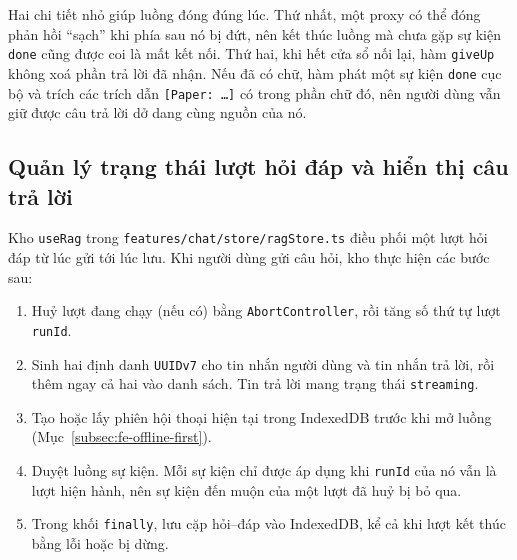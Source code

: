 
Hai chi tiết nhỏ giúp luồng đóng đúng lúc. Thứ nhất, một proxy có thể đóng phản hồi ``sạch'' khi phía sau nó bị đứt, nên kết thúc luồng mà chưa gặp sự kiện \texttt{done} cũng được coi là mất kết nối. Thứ hai, khi hết cửa sổ nối lại, hàm \texttt{giveUp} không xoá phần trả lời đã nhận. Nếu đã có chữ, hàm phát một sự kiện \texttt{done} cục bộ và trích các trích dẫn \texttt{[Paper: \dots]} có trong phần chữ đó, nên người dùng vẫn giữ được câu trả lời dở dang cùng nguồn của nó.

\subsection{Quản lý trạng thái lượt hỏi đáp và hiển thị câu trả lời}
\label{subsec:fe-rag-store}

Kho \texttt{useRag} trong \texttt{features/\allowbreak{}chat/\allowbreak{}store/\allowbreak{}ragStore.ts} điều phối một lượt hỏi đáp từ lúc gửi tới lúc lưu. Khi người dùng gửi câu hỏi, kho thực hiện các bước sau:
\begin{enumerate}
    \item Huỷ lượt đang chạy (nếu có) bằng \texttt{AbortController}, rồi tăng số thứ tự lượt \texttt{runId}.
    \item Sinh hai định danh \texttt{UUIDv7} cho tin nhắn người dùng và tin nhắn trả lời, rồi thêm ngay cả hai vào danh sách. Tin trả lời mang trạng thái \texttt{streaming}.
    \item Tạo hoặc lấy phiên hội thoại hiện tại trong IndexedDB trước khi mở luồng (Mục~\ref{subsec:fe-offline-first}).
    \item Duyệt luồng sự kiện. Mỗi sự kiện chỉ được áp dụng khi \texttt{runId} của nó vẫn là lượt hiện hành, nên sự kiện đến muộn của một lượt đã huỷ bị bỏ qua.
    \item Trong khối \texttt{finally}, lưu cặp hỏi--đáp vào IndexedDB, kể cả khi lượt kết thúc bằng lỗi hoặc bị dừng.
\end{enumerate}

